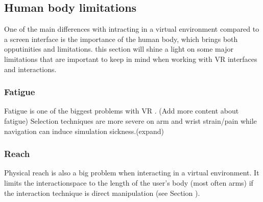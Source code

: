 \subsection{Human body limitations}
\label{theory:bodyLimits}
One of the main differences with intracting in a virtual environment compared to a screen interface is the importance of the human body, which brings both opputinities and limitations. this section will shine a light on some major limitations that are important to keep in mind when working with VR interfaces and interactions.
\subsubsection{Fatigue}
Fatigue is one of the biggest problems with VR \cite{limitations:burdea2003virtual}. (Add more content about fatigue)
Selection techniques are more severe on arm and wrist strain/pain while navigation can induce simulation sickness.(expand)
\subsubsection{Reach}
Physical reach is also a big problem when interacting in a virtual environment. It limits the interactionspace to the length of the user's body (most often arms) if the interaction technique is direct manipulation (see Section \label{theory:toolsandtech:raycast}).

